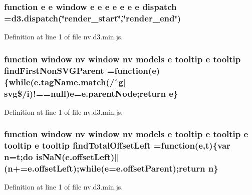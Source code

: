 \subsubsection[{dispatch}]{\setlength{\rightskip}{0pt plus 5cm}function {\bf e} {\bf e} {\bf window} {\bf e} {\bf e} {\bf e} {\bf e} {\bf e} {\bf e} {\bf e} dispatch =d3.\+dispatch(\char`\"{}render\+\_\+start\char`\"{},\char`\"{}render\+\_\+end\char`\"{})}\label{nv_8d3_8min_8js_a56be5399a1b86f9650738fb3e0da5856}


Definition at line 1 of file nv.\+d3.\+min.\+js.

\subsubsection[{find\+First\+Non\+S\+V\+G\+Parent}]{\setlength{\rightskip}{0pt plus 5cm}function {\bf window} {\bf nv} {\bf window} {\bf nv} {\bf models} {\bf e} {\bf tooltip} {\bf e} {\bf tooltip} find\+First\+Non\+S\+V\+G\+Parent =function({\bf e})\{while(e.\+tag\+Name.\+match(/$^\wedge$g$\vert$svg\$/{\bf i})!==null){\bf e}=e.\+parent\+Node;{\bf return} {\bf e}\}}\label{nv_8d3_8min_8js_ad3e3545fe1557ca903e924216db1df68}


Definition at line 1 of file nv.\+d3.\+min.\+js.

\subsubsection[{find\+Total\+Offset\+Left}]{\setlength{\rightskip}{0pt plus 5cm}function {\bf window} {\bf nv} {\bf window} {\bf nv} {\bf models} {\bf e} {\bf tooltip} {\bf e} {\bf tooltip} {\bf e} {\bf tooltip} {\bf e} {\bf tooltip} find\+Total\+Offset\+Left =function({\bf e},t)\{var {\bf n}=t;do is\+Na\+N(e.\+offset\+Left)$\vert$$\vert$({\bf n}+=e.\+offset\+Left);while({\bf e}=e.\+offset\+Parent);{\bf return} {\bf n}\}}\label{nv_8d3_8min_8js_a172b83f4aa1ca50a9635f68e7af094ae}


Definition at line 1 of file nv.\+d3.\+min.\+js.

